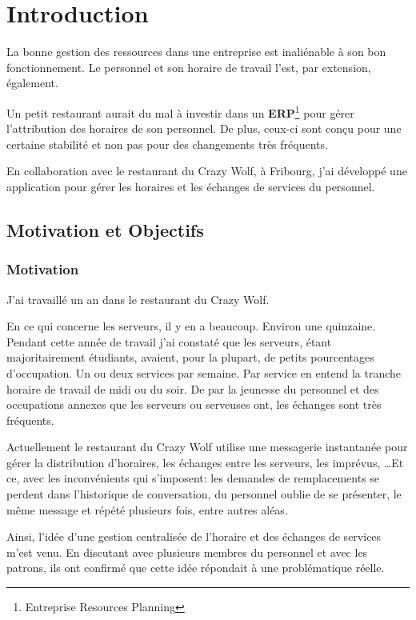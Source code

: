 \chapter[Introduction]{Introduction}
\cite{einstein}
La bonne gestion des ressources dans une entreprise est inaliénable à son bon fonctionnement. Le personnel et son horaire de travail l'est, par extension, également. 

Un petit restaurant aurait du mal à investir dans un \textbf{ERP}\footnote{Entreprise Resources Planning} pour gérer l'attribution des horaires de son personnel. De plus, ceux-ci sont conçu pour une certaine stabilité et non pas pour des changements très fréquents.

En collaboration avec le restaurant du Crazy Wolf, à Fribourg, j'ai développé une application pour gérer les horaires et les échanges de services du personnel.

\section[Motivations et objectifs]{Motivation et Objectifs}

\subsection*{Motivation}
J'ai travaillé un an dans le restaurant du Crazy Wolf.

En ce qui concerne les serveurs, il y en a beaucoup. Environ une quinzaine. Pendant cette année de travail j'ai constaté que les serveurs, étant majoritairement étudiants, avaient, pour la plupart, de petits pourcentages d'occupation. Un ou deux services par semaine. Par service en entend la tranche horaire de travail de midi ou du soir. 
De par la jeunesse du personnel et des occupations annexes que les serveurs ou serveuses ont, les échanges sont très fréquents. 

Actuellement le restaurant du Crazy Wolf utilise une messagerie instantanée pour gérer la distribution d'horaires, les échanges entre les serveurs, les imprévus, \dots Et ce, avec les inconvénients qui s'imposent: les demandes de remplacements se perdent dans l'historique de conversation, du personnel oublie de se présenter, le même message et répété plusieurs fois, entre autres aléas.



Ainsi, l'idée d'une gestion centralisée de l'horaire et des échanges de services m'est venu. En discutant avec plusieurs membres du personnel et avec les patrons, ils ont confirmé que cette idée répondait à une problématique réelle. 

